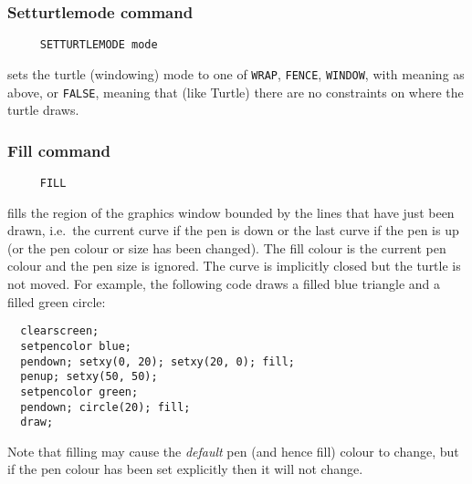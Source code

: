 \subsubsection*{Setturtlemode command}
\begin{verbatim}
     SETTURTLEMODE mode
\end{verbatim}
sets the turtle (windowing) mode to one of \texttt{WRAP},
\texttt{FENCE}, \texttt{WINDOW}, with meaning as above, or
\texttt{FALSE}, meaning that (like Turtle) there are no constraints on
where the turtle draws.

\subsubsection*{Fill command}
\begin{verbatim}
     FILL
\end{verbatim}
fills the region of the graphics window bounded by the lines that have
just been drawn, i.e.\ the current curve if the pen is down or the
last curve if the pen is up (or the pen colour or size has been
changed).  The fill colour is the current pen colour and the pen size
is ignored.  The curve is implicitly closed but the turtle is not
moved.  For example, the following code draws a filled blue triangle
and a filled green circle:
\begin{verbatim}
  clearscreen;
  setpencolor blue;
  pendown; setxy(0, 20); setxy(20, 0); fill;
  penup; setxy(50, 50);
  setpencolor green;
  pendown; circle(20); fill;
  draw;
\end{verbatim}
Note that filling may cause the \emph{default} pen (and hence fill)
colour to change, but if the pen colour has been set explicitly then
it will not change.

